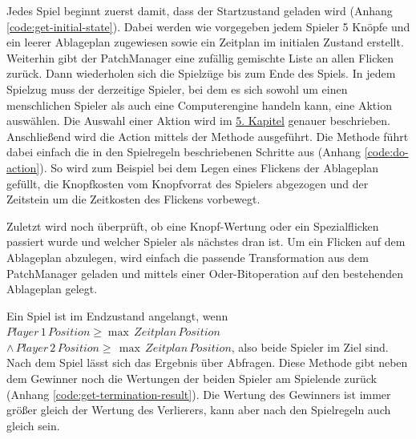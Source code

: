 Jedes Spiel beginnt zuerst damit, dass der Startzustand geladen wird (Anhang \ref{code:get-initial-state}). Dabei werden wie vorgegeben jedem Spieler 5 Knöpfe und ein leerer Ablageplan zugewiesen sowie ein Zeitplan im initialen Zustand erstellt. Weiterhin gibt der PatchManager eine zufällig gemischte Liste an allen Flicken zurück. Dann wiederholen sich die Spielzüge bis zum Ende des Spiels. In jedem Spielzug muss der derzeitige Spieler, bei dem es sich sowohl um einen menschlichen Spieler als auch eine Computerengine handeln kann, eine Aktion auswählen. Die Auswahl einer Aktion wird im \hyperref[chapter:erstellung-der-computerspielengines]{5. Kapitel} genauer beschrieben. Anschließend wird die Action mittels der Methode  ausgeführt. Die Methode führt dabei einfach die in den Spielregeln beschriebenen Schritte aus (Anhang \ref{code:do-action}). So wird zum Beispiel bei dem Legen eines Flickens der Ablageplan gefüllt, die Knopfkosten vom Knopfvorrat des Spielers abgezogen und der Zeitstein um die Zeitkosten des Flickens vorbewegt.

\vspace*{-5cm}
\pagebreak

Zuletzt wird noch überprüft, ob eine Knopf-Wertung oder ein Spezialflicken passiert wurde und welcher Spieler als nächstes dran ist. Um ein Flicken auf dem Ablageplan abzulegen, wird einfach die passende Transformation aus dem PatchManager geladen und mittels einer Oder-Bitoperation auf den bestehenden Ablageplan gelegt.

Ein Spiel ist im Endzustand angelangt, wenn $Player\, 1\, Position \ge \max\, Zeitplan\, Position$ $\wedge\, Player\, 2\, Position \ge\, \max\, Zeitplan\, Position$, also beide Spieler im Ziel sind. Nach dem Spiel lässt sich das Ergebnis über  Abfragen. Diese Methode gibt neben dem Gewinner noch die Wertungen der beiden Spieler am Spielende zurück (Anhang \ref{code:get-termination-result}). Die Wertung des Gewinners ist immer größer gleich der Wertung des Verlierers, kann aber nach den Spielregeln auch gleich sein.

